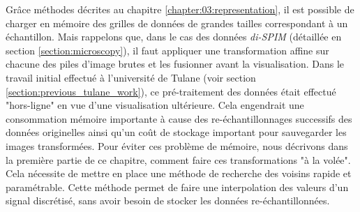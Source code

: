 {	%
	Grâce méthodes décrites au chapitre \ref{chapter:03:representation}, il est possible de charger en mémoire des grilles de données de grandes tailles correspondant à un échantillon. Mais rappelons que, dans le cas des données \textit{di-SPIM} (détaillée en section \ref{section:microscopy}), il faut appliquer une transformation affine sur chacune des piles d'image brutes et les fusionner avant la visualisation.    %
	Dans le travail initial effectué à l'université de Tulane (voir section \ref{section:previous_tulane_work}), ce pré-traitement des données était effectué "hors-ligne" en vue d'une visualisation ultérieure. Cela engendrait une consommation mémoire importante à cause des re-échantillonnages successifs des données originelles ainsi qu'un coût de stockage important pour sauvegarder les images transformées. Pour éviter ces problème de mémoire, nous décrivons dans la première partie de ce chapitre, comment faire ces transformations "à la volée". Cela nécessite de mettre en place une méthode de recherche des voisins rapide et paramétrable. Cette méthode permet de faire une interpolation des valeurs d'un signal discrétisé, sans avoir besoin de stocker les données re-échantillonnées.
	
	

    

}
